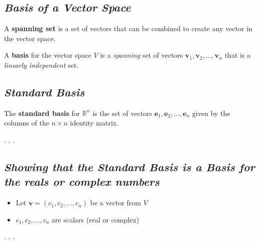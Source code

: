 \documentclass[
  letterpaper,
  DIV=11,
  numbers=noendperiod]{scrartcl}
\providecommand{\tightlist}{%
  \setlength{\itemsep}{0pt}\setlength{\parskip}{0pt}}\usepackage{longtable,booktabs,array}
\begin{document}
\subsection{\texorpdfstring{\emph{Basis of a Vector
Space}}{Basis of a Vector Space}}\label{basis-of-a-vector-space}

A \textbf{spanning set} is a set of vectors that can be combined to
create any vector in the vector space.

A \textbf{basis} for the vector space \(V\) is a \emph{spanning} set of
vectors \(\mathbf{v}_{1}, \mathbf{v}_{2}, \ldots, \mathbf{v}_{n}\) that
is a \emph{linearly independent} set.

\subsection{\texorpdfstring{\emph{Standard
Basis}}{Standard Basis}}\label{standard-basis}

The \textbf{standard basis} for \(\mathbb{R}^{n}\) is the set of vectors
\(\mathbf{e}_{1}, \mathbf{e}_{2}, \ldots, \mathbf{e}_{n}\) given by the
columns of the \(n \times n\) identity matrix.

. . .

\subsection{\texorpdfstring{\emph{Showing that the Standard Basis is a
Basis for the reals or complex
numbers}}{Showing that the Standard Basis is a Basis for the reals or complex numbers}}\label{showing-that-the-standard-basis-is-a-basis-for-the-reals-or-complex-numbers}

\begin{itemize}
\tightlist
\item
  Let \(\mathbf{v}=\left(c_{1}, c_{2}, \ldots, c_{n}\right)\) be a
  vector from \(V\)
\item
  \(c_{1}, c_{2}, \ldots, c_{n}\) are scalars (real or complex)
\end{itemize}

. . .
\end{document}
